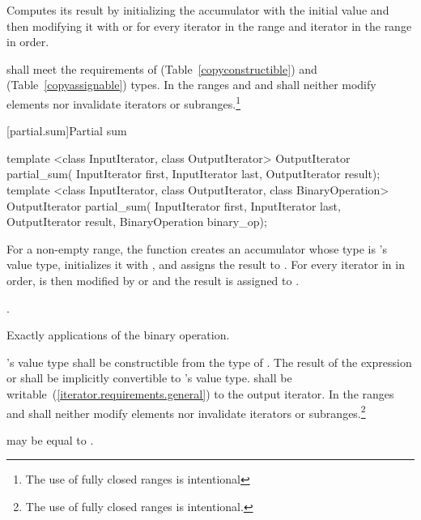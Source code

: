 \begin{itemdescr}
\pnum
\effects
Computes its result by initializing the accumulator
with the initial value
and then modifying it with
or
for every iterator
in the range 
and iterator
in the range
in order.

\pnum
\requires
{} shall meet the requirements of  (Table~\ref{copyconstructible})
and  (Table~\ref{copyassignable}) types.
In the ranges
and
and
shall neither modify elements nor invalidate iterators or subranges.\footnote{The use of fully closed ranges is intentional
}
\end{itemdescr}

[partial.sum]{Partial sum}

%
\begin{itemdecl}
template <class InputIterator, class OutputIterator>
  OutputIterator partial_sum(
    InputIterator first, InputIterator last,
    OutputIterator result);
template <class InputIterator, class OutputIterator, class BinaryOperation>
  OutputIterator partial_sum(
    InputIterator first, InputIterator last,
    OutputIterator result, BinaryOperation binary_op);
\end{itemdecl}

\begin{itemdescr}
\pnum
\effects For a non-empty range,
the function creates an accumulator  whose type is 's
value type, initializes it with ,
and assigns the result to . For every iterator  in 
in order,  is then modified by  or 
and the result is assigned to .

\pnum
\returns
{}.

\pnum
\complexity
Exactly
applications of
the binary operation.

\pnum
\requires
{}'s value type shall be constructible from the type of .
The result of the expression  or  shall be
implicitly convertible to 's value type. 
shall be writable~(\ref{iterator.requirements.general}) to the  output iterator.
In the ranges
and
\mbox{}
shall neither modify elements nor invalidate iterators or subranges.\footnote{The use of fully closed ranges is intentional.
}

\pnum
\remarks
{}
may be equal to
.
\end{itemdescr}

